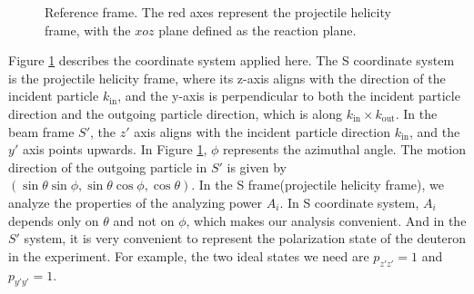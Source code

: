 \documentclass[twocolumn,twoside,showpacs,showkeys,preprintnumbers,superscriptaddress,amsmath,amssymb,prc,nofootinbib,a4paper]{revtex4}
\begin{document}
\begin{figure}
\begin{center}
\end{center}
\caption{Reference frame. The red axes represent the projectile helicity frame, with the $xoz$ plane defined as the reaction plane.}
\label{fig:frame}
\end{figure}
 Figure \ref{fig:frame} describes the coordinate system applied here. The S coordinate system is the projectile helicity frame, where its z-axis aligns with the direction of the incident particle $k_{\text{in}}$, and the y-axis is perpendicular to both the incident particle direction and the outgoing particle direction, which is along $k_{\text{in}} \times k_{\text{out}}$. In the beam frame $S'$, the $z'$ axis aligns with the incident particle direction $k_{\text{in}}$, and the $y'$ axis points upwards. In Figure \ref{fig:frame}, $\phi$ represents the azimuthal angle. The motion direction of the outgoing particle in $S'$ is given by $(\sin \theta \sin \phi, \sin \theta \cos \phi, \cos \theta)$.
In the S frame(projectile helicity frame), we analyze the properties of the analyzing power $A_i$. In S coordinate system, $A_i$ depends only on $\theta$ and not on $\phi$, which makes our analysis convenient. And in the $S'$ system, it is very convenient to represent the polarization state of the deuteron in the experiment. For example, the two ideal states we need are $p_{z'z'}=1$ and $p_{y'y'}=1$.
\end{document}
